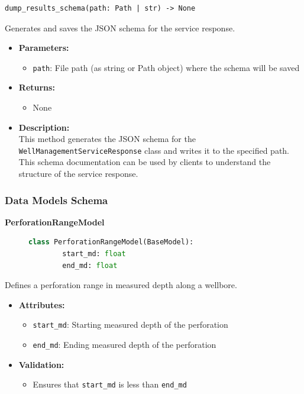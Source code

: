 \begin{verbatim}
dump_results_schema(path: Path | str) -> None
\end{verbatim}


Generates and saves the JSON schema for the service response.

\begin{itemize}
\item \textbf{Parameters:}
\begin{itemize}
\item \texttt{path}: File path (as string or Path object) where the schema will be saved
\end{itemize}
\item \textbf{Returns:}
\begin{itemize}
\item None
\end{itemize}
\item \textbf{Description:}\\
This method generates the JSON schema for the \texttt{WellManagementServiceResponse} class and writes it to the specified path. This schema documentation can be used by clients to understand the structure of the service response.
\end{itemize}



\subsubsection{Data Models Schema}

\textbf{PerforationRangeModel}
\begin{figure}[H]
	\begin{lstlisting}[language=Python, caption=PerforationRangeModel class definition]
		class PerforationRangeModel(BaseModel):
		start_md: float
		end_md: float
	\end{lstlisting}
\end{figure}

Defines a perforation range in measured depth along a wellbore.

\begin{itemize}
	\item \textbf{Attributes:}
	\begin{itemize}
		\item \texttt{start\_md}: Starting measured depth of the perforation
		\item \texttt{end\_md}: Ending measured depth of the perforation
	\end{itemize}
	\item \textbf{Validation:}
	\begin{itemize}
		\item Ensures that \texttt{start\_md} is less than \texttt{end\_md}
	\end{itemize}
\end{itemize}

